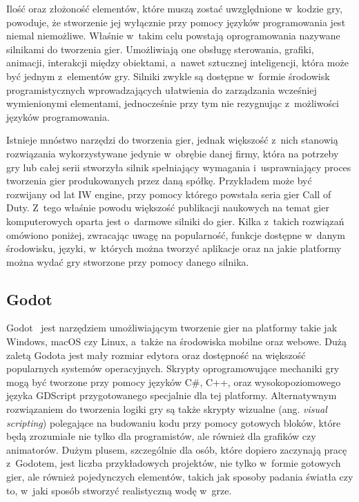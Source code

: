 Ilość oraz złożoność elementów, które muszą zostać uwzględnione w~kodzie gry, powoduje, że stworzenie jej wyłącznie przy pomocy języków programowania jest niemal niemożliwe. Właśnie w~takim celu powstają oprogramowania nazywane silnikami do tworzenia gier. Umożliwiają one obsługę sterowania, grafiki, animacji, interakcji między obiektami, a~nawet sztucznej inteligencji, która może być jednym z~elementów gry. Silniki zwykle są dostępne w~formie środowisk programistycznych wprowadzających ułatwienia do zarządzania wcześniej wymienionymi elementami, jednocześnie przy tym nie rezygnując z~możliwości języków programowania. 

Istnieje mnóstwo narzędzi do tworzenia gier, jednak większość z~nich stanowią rozwiązania wykorzystywane jedynie w~obrębie danej firmy, która na potrzeby gry lub całej serii stworzyła silnik spełniający wymagania i~usprawniający proces tworzenia gier produkowanych przez daną spółkę. Przykładem może być rozwijany od lat IW engine, przy pomocy którego powstała seria gier Call of Duty. Z~tego właśnie powodu większość publikacji naukowych na temat gier komputerowych oparta jest o~darmowe silniki do gier. Kilka z~takich rozwiązań omówiono poniżej, zwracając uwagę na popularność, funkcje dostępne w~danym środowisku, języki, w~których można tworzyć aplikacje oraz na jakie platformy można wydać gry stworzone przy pomocy danego silnika.

\subsection{Godot}
Godot~\cite{godot_documentation} jest narzędziem umożliwiającym tworzenie gier na platformy takie jak Windows, macOS czy Linux, a~także na środowiska mobilne oraz webowe. Dużą zaletą Godota jest mały rozmiar edytora oraz dostępność na większość popularnych systemów operacyjnych. Skrypty oprogramowujące mechaniki gry mogą być tworzone przy pomocy języków C\#, C++, oraz wysokopoziomowego języka GDScript przygotowanego specjalnie dla tej platformy. Alternatywnym rozwiązaniem do tworzenia logiki gry są także skrypty wizualne (ang. \textit{visual scripting}) polegające na budowaniu kodu przy pomocy gotowych bloków, które będą zrozumiałe nie tylko dla programistów, ale również dla grafików czy animatorów. Dużym plusem, szczególnie dla osób, które dopiero zaczynają pracę z~Godotem, jest liczba przykładowych projektów, nie tylko w~formie gotowych gier, ale również pojedynczych elementów, takich jak sposoby padania światła czy to, w~jaki sposób stworzyć realistyczną wodę w~grze. 

